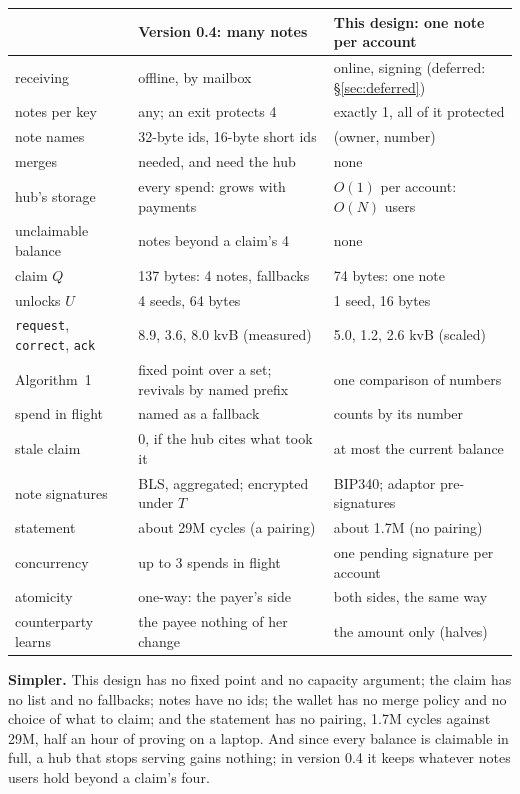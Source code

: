 \documentclass[11pt]{article}
\theoremstyle{plain}
\theoremstyle{definition}
\newcommand{\tx}[1]{\texttt{#1}}
\begin{document}
\begin{center}
\begin{tabularx}{\linewidth}{lLL}
\toprule
& Version 0.4: many notes & This design: one note per account \\
\midrule
receiving & offline, by mailbox & online, signing (deferred: \S\ref{sec:deferred}) \\
notes per key & any; an exit protects 4 & exactly 1, all of it protected \\
note names & 32-byte ids, 16-byte short ids & (owner, number) \\
merges & needed, and need the hub & none \\
hub's storage & every spend: grows with payments & $O(1)$ per account: $O(N)$ users \\
unclaimable balance & notes beyond a claim's 4 & none \\
claim $Q$ & 137 bytes: 4 notes, fallbacks & 74 bytes: one note \\
unlocks $U$ & 4 seeds, 64 bytes & 1 seed, 16 bytes \\
\tx{request}, \tx{correct}, \tx{ack} & 8.9, 3.6, 8.0 kvB (measured) & 5.0, 1.2, 2.6 kvB (scaled) \\
Algorithm~1 & fixed point over a set; revivals by named prefix & one comparison of numbers \\
spend in flight & named as a fallback & counts by its number \\
stale claim & 0, if the hub cites what took it & at most the current balance \\
note signatures & BLS, aggregated; encrypted under $T$ & BIP340; adaptor pre-signatures \\
statement & about 29M cycles (a pairing) & about 1.7M (no pairing) \\
concurrency & up to 3 spends in flight & one pending signature per account \\
atomicity & one-way: the payer's side & both sides, the same way \\
counterparty learns & the payee nothing of her change & the amount only (halves) \\
\bottomrule
\end{tabularx}
\end{center}

\textbf{Simpler.} This design has no fixed point and no capacity
argument; the claim has no list and no fallbacks; notes have no ids; the
wallet has no merge policy and no choice of what to claim; and the
statement has no pairing, 1.7M cycles against 29M, half an hour of
proving on a laptop. And since every balance is claimable in full, a
hub that stops serving gains nothing; in version 0.4 it keeps whatever
notes users hold beyond a claim's four.
\end{document}
